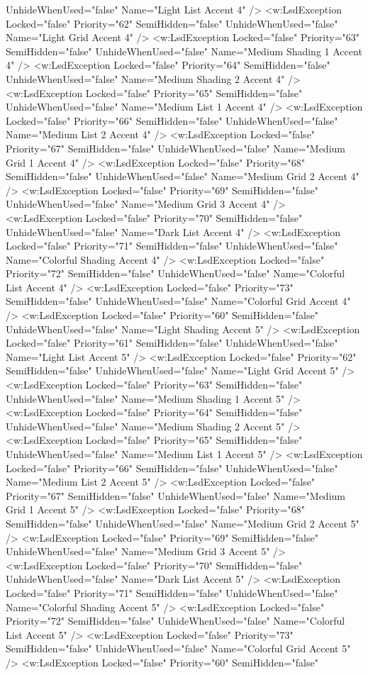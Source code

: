 UnhideWhenUsed="false" Name="Light List Accent 4" /> <w:LsdException Locked="false" Priority="62" SemiHidden="false"    UnhideWhenUsed="false" Name="Light Grid Accent 4" /> <w:LsdException Locked="false" Priority="63" SemiHidden="false"    UnhideWhenUsed="false" Name="Medium Shading 1 Accent 4" /> <w:LsdException Locked="false" Priority="64" SemiHidden="false"    UnhideWhenUsed="false" Name="Medium Shading 2 Accent 4" /> <w:LsdException Locked="false" Priority="65" SemiHidden="false"    UnhideWhenUsed="false" Name="Medium List 1 Accent 4" /> <w:LsdException Locked="false" Priority="66" SemiHidden="false"    UnhideWhenUsed="false" Name="Medium List 2 Accent 4" /> <w:LsdException Locked="false" Priority="67" SemiHidden="false"    UnhideWhenUsed="false" Name="Medium Grid 1 Accent 4" /> <w:LsdException Locked="false" Priority="68" SemiHidden="false"    UnhideWhenUsed="false" Name="Medium Grid 2 Accent 4" /> <w:LsdException Locked="false" Priority="69" SemiHidden="false"    UnhideWhenUsed="false" Name="Medium Grid 3 Accent 4" /> <w:LsdException Locked="false" Priority="70" SemiHidden="false"    UnhideWhenUsed="false" Name="Dark List Accent 4" /> <w:LsdException Locked="false" Priority="71" SemiHidden="false"    UnhideWhenUsed="false" Name="Colorful Shading Accent 4" /> <w:LsdException Locked="false" Priority="72" SemiHidden="false"    UnhideWhenUsed="false" Name="Colorful List Accent 4" /> <w:LsdException Locked="false" Priority="73" SemiHidden="false"    UnhideWhenUsed="false" Name="Colorful Grid Accent 4" /> <w:LsdException Locked="false" Priority="60" SemiHidden="false"    UnhideWhenUsed="false" Name="Light Shading Accent 5" /> <w:LsdException Locked="false" Priority="61" SemiHidden="false"    UnhideWhenUsed="false" Name="Light List Accent 5" /> <w:LsdException Locked="false" Priority="62" SemiHidden="false"    UnhideWhenUsed="false" Name="Light Grid Accent 5" /> <w:LsdException Locked="false" Priority="63" SemiHidden="false"    UnhideWhenUsed="false" Name="Medium Shading 1 Accent 5" /> <w:LsdException Locked="false" Priority="64" SemiHidden="false"    UnhideWhenUsed="false" Name="Medium Shading 2 Accent 5" /> <w:LsdException Locked="false" Priority="65" SemiHidden="false"    UnhideWhenUsed="false" Name="Medium List 1 Accent 5" /> <w:LsdException Locked="false" Priority="66" SemiHidden="false"    UnhideWhenUsed="false" Name="Medium List 2 Accent 5" /> <w:LsdException Locked="false" Priority="67" SemiHidden="false"    UnhideWhenUsed="false" Name="Medium Grid 1 Accent 5" /> <w:LsdException Locked="false" Priority="68" SemiHidden="false"    UnhideWhenUsed="false" Name="Medium Grid 2 Accent 5" /> <w:LsdException Locked="false" Priority="69" SemiHidden="false"    UnhideWhenUsed="false" Name="Medium Grid 3 Accent 5" /> <w:LsdException Locked="false" Priority="70" SemiHidden="false"    UnhideWhenUsed="false" Name="Dark List Accent 5" /> <w:LsdException Locked="false" Priority="71" SemiHidden="false"    UnhideWhenUsed="false" Name="Colorful Shading Accent 5" /> <w:LsdException Locked="false" Priority="72" SemiHidden="false"    UnhideWhenUsed="false" Name="Colorful List Accent 5" /> <w:LsdException Locked="false" Priority="73" SemiHidden="false"    UnhideWhenUsed="false" Name="Colorful Grid Accent 5" /> <w:LsdException Locked="false" Priority="60" SemiHidden="false"    